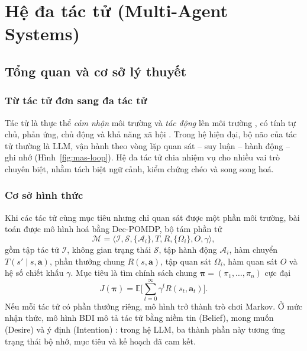 \chapter{Hệ đa tác tử (Multi-Agent Systems)}\label{chap:mas}

\section{Tổng quan và cơ sở lý thuyết}\label{sec:mas-theory}
\subsection{Từ tác tử đơn sang đa tác tử}
Tác tử là thực thể \emph{cảm nhận} môi trường và \emph{tác động} lên môi trường \cite{ch7:russell2021}, có tính tự chủ, phản ứng, chủ động và khả năng xã hội \cite{ch7:wooldridge2009}. Trong hệ hiện đại, bộ não của tác tử thường là LLM, vận hành theo vòng lặp quan sát -- suy luận -- hành động -- ghi nhớ \cite{ch1:yao2023} (Hình~\ref{fig:mas-loop}). Hệ đa tác tử chia nhiệm vụ cho nhiều vai trò chuyên biệt, nhằm tách biệt ngữ cảnh, kiểm chứng chéo và song song hoá.


\subsection{Cơ sở hình thức}
Khi các tác tử cùng mục tiêu nhưng chỉ quan sát được một phần môi trường, bài toán được mô hình hoá bằng Dec-POMDP, bộ tám phần tử
\begin{equation}
  \mathcal{M}=\big\langle \mathcal{I},\mathcal{S},\{\mathcal{A}_i\},T,R,\{\Omega_i\},O,\gamma\big\rangle,
\end{equation}
gồm tập tác tử $\mathcal{I}$, không gian trạng thái $\mathcal{S}$, tập hành động $\mathcal{A}_i$, hàm chuyển $T(s'\mid s,\mathbf{a})$, phần thưởng chung $R(s,\mathbf{a})$, tập quan sát $\Omega_i$, hàm quan sát $O$ và hệ số chiết khấu $\gamma$. Mục tiêu là tìm chính sách chung $\boldsymbol\pi=(\pi_1,\dots,\pi_n)$ cực đại
\begin{equation}
  J(\boldsymbol\pi)=\mathbb{E}\Big[\sum_{t=0}^{\infty}\gamma^t R(s_t,\mathbf{a}_t)\Big].
\end{equation}
Nếu mỗi tác tử có phần thưởng riêng, mô hình trở thành trò chơi Markov. Ở mức nhận thức, mô hình BDI mô tả tác tử bằng niềm tin (Belief), mong muốn (Desire) và ý định (Intention) \cite{ch7:wooldridge2009}: trong hệ LLM, ba thành phần này tương ứng trạng thái bộ nhớ, mục tiêu và kế hoạch đã cam kết.

